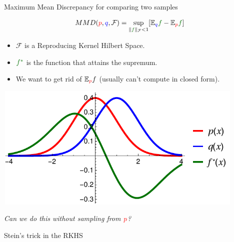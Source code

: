 \begin{frame}
\begin{columns}
\begin{column}{.33\linewidth}
\begin{block}{Maximum Mean Discrepancy for comparing two samples}
\begin{minipage}{.60\linewidth}

\vspace{1cm}
\large
\begin{align*}
MMD({\color{red} p},{ \color{blue} q},\mathcal{F}) = \sup_{   \| {\color{mg}f} \|_\mathcal{F}<1} [\ev_{{ \color{blue} q}}{\color{mg}f}- \ev_{{\color{red} p}}{\color{mg} f}]   
\end{align*}
\normalsize
\vspace{1cm}
 \begin{itemize}
  \item $\mathcal{F}$ is a Reproducing Kernel Hilbert Space.
  \item ${\color{mg} f^*}$ is the function that attains the supremum.
  \item We want to get rid of  $\mathbb{E}_{ {\color{red} p} }f$  (usually can't compute in closed form).
 \end{itemize}

\end{minipage}
\begin{minipage}{.35\linewidth}

\begin{center}
\vspace{-1cm}
\hspace{-2.5cm}
\includegraphics[width=12cm,height=6cm]{../../presentation/img/mmd.pdf}
\end{center}
\end{minipage}
\vspace{1cm}
\begin{center}
\emph{Can we do this without sampling from ${\color{red} p}$?}
\end{center}
\end{block}
\vspace{-0.75cm}  %
\begin{block}{Stein's trick in the RKHS}



\end{block}
\end{column}
\end{columns}
\end{frame}
